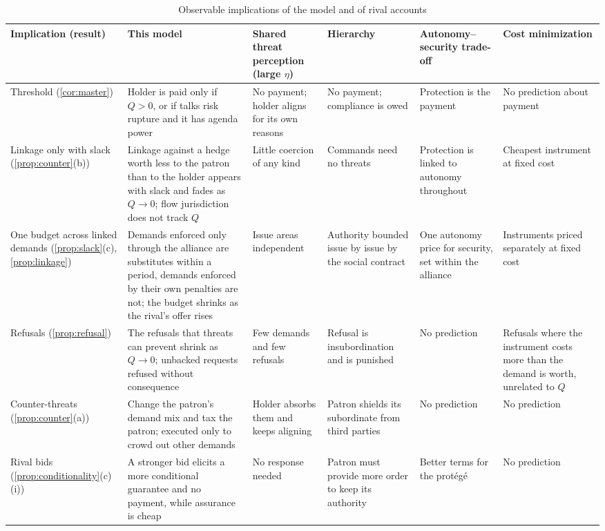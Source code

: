 \begin{table}[!tbp]
\centering
\scriptsize
\setlength{\tabcolsep}{3pt}
\caption{Observable implications of the model and of rival accounts}\label{tab:implications}
\begin{tabularx}{\textwidth}{@{}>{\raggedright\arraybackslash}p{2.35cm}*{5}{>{\raggedright\arraybackslash}X}@{}}
\toprule
Implication (result) & This model & Shared threat perception (large $\eta$) & Hierarchy & Autonomy--security trade-off & Cost minimization\\
\midrule
Threshold (\cref{cor:master}) & Holder is paid only if $Q>0$, or if talks risk rupture and it has agenda power & No payment; holder aligns for its own reasons & No payment; compliance is owed & Protection is the payment & No prediction about payment\\
\addlinespace
Linkage only with slack (\cref{prop:counter}(b)) & Linkage against a hedge worth less to the patron than to the holder appears with slack and fades as $Q\to0$; flow jurisdiction does not track $Q$ & Little coercion of any kind & Commands need no threats & Protection is linked to autonomy throughout & Cheapest instrument at fixed cost\\
\addlinespace
One budget across linked demands (\cref{prop:slack}(c), \cref{prop:linkage}) & Demands enforced only through the alliance are substitutes within a period, demands enforced by their own penalties are not; the budget shrinks as the rival's offer rises & Issue areas independent & Authority bounded issue by issue by the social contract & One autonomy price for security, set within the alliance & Instruments priced separately at fixed cost\\
\addlinespace
Refusals (\cref{prop:refusal}) & The refusals that threats can prevent shrink as $Q\to0$; unbacked requests refused without consequence & Few demands and few refusals & Refusal is insubordination and is punished & No prediction & Refusals where the instrument costs more than the demand is worth, unrelated to $Q$\\
\addlinespace
Counter-threats (\cref{prop:counter}(a)) & Change the patron's demand mix and tax the patron; executed only to crowd out other demands & Holder absorbs them and keeps aligning & Patron shields its subordinate from third parties & No prediction & No prediction\\
\addlinespace
Rival bids (\cref{prop:conditionality}(c)(i)) & A stronger bid elicits a more conditional guarantee and no payment, while assurance is cheap & No response needed & Patron must provide more order to keep its authority & Better terms for the protégé & No prediction\\

\end{tabularx}
\end{table}
